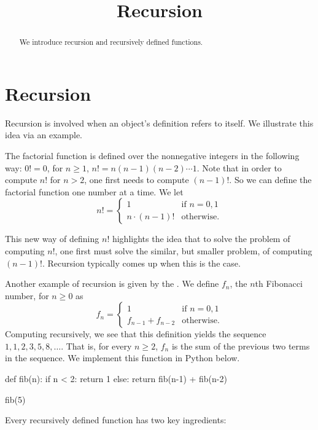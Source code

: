 \documentclass{ximera}
\title{Recursion}
\begin{document}
  
\begin{abstract}  
We introduce recursion and recursively defined functions.
\end{abstract}  
\maketitle

\section{Recursion}

Recursion is involved when an object's definition refers to itself. We illustrate this idea via an example.

The factorial function is defined over the nonnegative integers in the following way: $0!=0$, for $n\geq 1$, $n!=n(n-1)(n-2)\cdots 1$. Note that in order to compute $n!$ for $n>2$, one first needs to compute $(n-1)!$. So we can define the factorial function one number at a time. We let $$n!=\begin{cases} 1 & \text{if $n=0,1$}\\ n\cdot(n-1)! & \text{otherwise.}\end{cases}$$

This new way of defining $n!$ highlights the idea that to solve the problem of computing $n!$, one first must solve the similar, but smaller problem, of computing $(n-1)!$. Recursion typically comes up when this is the case.

Another example of recursion is given by the . We define $f_n$, the $n$th Fibonacci number, for $n\geq 0$ as $$f_n=\begin{cases} 1 & \text{if $n=0,1$}\\ f_{n-1}+f_{n-2} & \text{otherwise.}\end{cases}$$ Computing recursively, we see that this definition yields the sequence $1,1,2,3,5,8,\dots$. That is, for every $n\geq 2$, $f_n$ is the sum of the previous two terms in the sequence. We implement this function in Python below.

\begin{sageCell}
def fib(n):
        if n < 2:
                return 1
        else:
                return fib(n-1) + fib(n-2)

fib(5)
\end{sageCell}

Every recursively defined function has two key ingredients:
\end{document}
